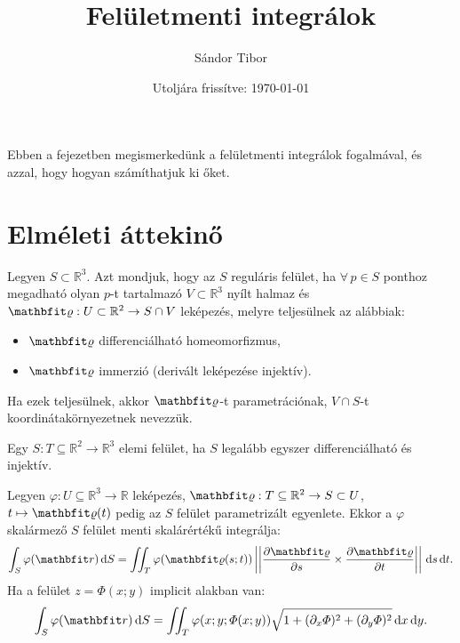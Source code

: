 \documentclass[lang=magyar]{math-handout}
\title{Felületmenti integrálok}
\date{Utoljára frissítve: \today}
\author{Sándor Tibor}
\begin{document}
\allowdisplaybreaks

\maketitle

\vspace{1em}

\begin{summary}
  Ebben a fejezetben megismerkedünk a felületmenti integrálok fogalmával, és
  azzal, hogy hogyan számíthatjuk ki őket.
\end{summary}

\vspace{-1em}

\section{Elméleti áttekinő}

\vspace{1em}

\begin{definition}
  Legyen $S \subset  \mathbb R^3$. Azt mondjuk, hogy az $S$ reguláris felület,
  ha $\forall \, p \in S$ ponthoz megadható olyan $p$-t tartalmazó $V \subset
    \mathbb R^3$ nyílt halmaz és $\rvec \varrho : U \subset \mathbb R^2
    \rightarrow S \cap V$ leképezés, melyre teljesülnek az alábbiak:
  \begin{itemize}
    \item $\rvec \varrho$ differenciálható homeomorfizmus,

    \item $\rvec \varrho$ immerzió (derivált leképezése injektív).
  \end{itemize}
  Ha ezek teljesülnek, akkor $\rvec \varrho$-t parametrációnak,
  $V \cap S$-t  koordinátakörnyezetnek nevezzük.
\end{definition}

\vfill

\begin{definition}
  Egy $S: T \subseteq \mathbb R^2 \rightarrow \mathbb R^3$ elemi felület, ha
  $S$ legalább egyszer differenciálható és injektív.
\end{definition}

\vfill

\begin{definition}
  Legyen $\varphi: U \subseteq \mathbb R^3 \rightarrow \mathbb R$ leképezés,
  $\rvec \varrho: T \subseteq \mathbb R^2 \rightarrow S \subset U$, $t \mapsto
    \rvec \varrho(t)$ pedig az $S$ felület parametrizált egyenlete. Ekkor a
  $\varphi$ skalármező $S$ felület menti skalárértékű integrálja:
  \[
    \int_S \varphi (\rvec r) \, \diff S =
    \iint_T \varphi (\rvec \varrho(s; t))
    \norma{\pdv{\rvec \varrho}{s} \times \pdv{\rvec \varrho}{t}}
    \, \diff s \, \diff t
    \text.
  \]
  Ha a felület $z = \varPhi(x; y)$ implicit alakban van:
  \[
    \int_S \varphi (\rvec r) \, \diff S =
    \iint_T \varphi (x; y; \varPhi(x;y))
    \sqrt{1 + (\partial_x \varPhi)^2 + (\partial_y \varPhi)^2}
    \, \diff x \, \diff y
    \text.
  \]
\end{definition}
\end{document}

